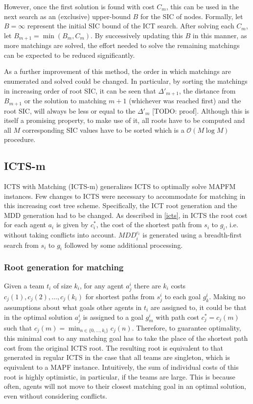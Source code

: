 \documentclass[english]{article}
\begin{document}
	However, once the first solution is found with cost $C_m$, this can be used in the next search as an (exclusive) upper-bound $B$ for the SIC of nodes. Formally, let $B = \infty$ represent the initial SIC bound of the ICT search. After solving each $C_m$, let $B_{m+1} = \min(B_m,C_m)$. By successively updating this $B$ in this manner, as more matchings are solved, the effort needed to solve the remaining matchings can be expected to be reduced significantly.
	
	As a further improvement of this method, the order in which matchings are enumerated and solved could be changed. In particular, by sorting the matchings in increasing order of root SIC, it can be seen that $\Delta'_{m + 1}$, the distance from $B_{m+1}$ or the solution to matching $m + 1$ (whichever was reached first) and the root SIC, will always be less or equal to the $\Delta'_m$ [TODO: proof]. Although this is itself a promising property, to make use of it, all roots have to be computed and all $M$ corresponding SIC values have to be sorted which is a $\mathcal{O}(M\log M)$ procedure. 
	
	\subsection{ICTS-m}
	ICTS with Matching (ICTS-m) generalizes ICTS to optimally solve MAPFM instances. Few changes to ICTS were necessary to accommodate for matching in this increasing cost tree scheme. Specifically, the ICT root generation and the MDD generation had to be changed. As described in \ref{icts}, in ICTS the root cost for each agent $a_i$ is given by $c^*_i$, the cost of the shortest path from $s_i$ to $g_i$, i.e. without taking conflicts into account. $MDD_i^{c_i}$ is generated using a breadth-first search from $s_i$ to $g_i$ followed by some additional processing.
	\subsubsection{Root generation for matching}
	Given a team $t_i$ of size $k_i$, for any agent $a_j^i$ there are $k_i$ costs $c_j(1),c_j(2),\ldots,c_j(k_i)$ for shortest paths from $s_j^i$ to each goal $g_k^i$. Making no assumptions about what goals other agents in $t_i$ are assigned to, it could be that in the optimal solution $a_j^i$ is assigned to a goal $g_{m}^i$ with path cost $c^*_j = c_j(m)$ such that $c_j(m) = \min_{n\in\{0,\ldots,k_i\}} c_j(n)$. Therefore, to guarantee optimality, this minimal cost to any matching goal has to take the place of the shortest path cost from the original ICTS root. The resulting root is equivalent to that generated in regular ICTS in the case that all teams are singleton, which is equivalent to a MAPF instance. Intuitively, the sum of individual costs of this root is highly optimistic, in particular, if the teams are large. This is because often, agents will not move to their closest matching goal in an optimal solution, even without considering conflicts.
	
\end{document}
